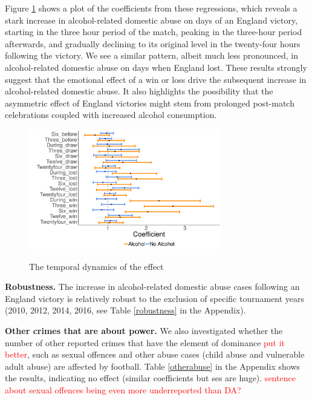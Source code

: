 \documentclass[12pt, letterpaper]{article}
\begin{document}
Figure \ref{fig:threehours} shows a plot of the coefficients from these regressions, which reveals a stark increase in alcohol-related domestic abuse on days of an England victory, starting in the three hour period of the match, peaking in the three-hour period afterwards, and gradually declining to its original level in the twenty-four hours following the victory. We see a similar pattern, albeit much less pronounced, in alcohol-related domestic abuse on days when England lost. These results strongly suggest that the emotional effect of a win or loss drive the subsequent increase in alcohol-related domestic abuse. It also highlights the possibility that the asymmetric effect of England victories might stem from prolonged post-match celebrations coupled with increased alcohol consumption.


\begin{figure}
\centering
 \caption{The temporal dynamics of the effect}
\includegraphics[width=0.75\textwidth]{Threehours.pdf}
\label{fig:threehours}
\end{figure}

\newpage


\textbf{Robustness.} The increase in alcohol-related domestic abuse cases following an England victory is relatively robust to the exclusion of specific tournament years (2010, 2012, 2014, 2016, see Table \ref{robustness} in the Appendix). 

\textbf{Other crimes that are about power.} We also investigated whether the number of other reported crimes that have the element of dominance \textcolor{red}{put it better}, such as sexual offences and other abuse cases (child abuse and vulnerable adult abuse) are affected by football. Table \ref{otherabuse} in the Appendix shows the results, indicating no effect (similar coefficients but ses are huge). \textcolor{red}{sentence about sexual offences being even more underreported than DA?}
\end{document}
